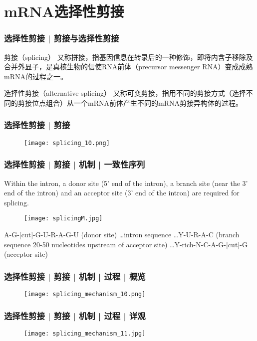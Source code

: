 \section{mRNA选择性剪接}
\begin{frame}
  \frametitle{选择性剪接 | \alert{剪接与选择性剪接}}
  \begin{block}{剪接（splicing）}
    又称拼接，指基因信息在转录后的一种修饰，即将内含子移除及合并外显子，是真核生物的信使RNA前体（precursor messenger RNA）变成成熟mRNA的过程之一。
  \end{block}
  \pause
  \begin{block}{选择性剪接（alternative splicing）}
    又称可变剪接，指用不同的剪接方式（选择不同的剪接位点组合）从一个mRNA前体产生不同的mRNA剪接异构体的过程。
  \end{block}
\end{frame}

\begin{frame}
  \frametitle{选择性剪接 | 剪接}
  \begin{figure}
    \centering
    \texttt{[image: splicing\_10.png]}
  \end{figure}
\end{frame}

\begin{frame}
  \frametitle{选择性剪接 | 剪接 | 机制 | 一致性序列}
Within the intron, a donor site (5' end of the intron), a branch site (near the 3' end of the intron) and an acceptor site (3' end of the intron) are required for splicing.
  \begin{figure}
    \centering
    \texttt{[image: splicingM.jpg]}
  \end{figure}
A-G-[cut]-G-U-R-A-G-U (donor site) \ldots intron sequence \ldots Y-U-R-A-C (branch sequence 20-50 nucleotides upstream of acceptor site) \ldots Y-rich-N-C-A-G-[cut]-G (acceptor site)
\end{frame}

\begin{frame}
  \frametitle{选择性剪接 | 剪接 | 机制 | 过程 | 概览}
  \begin{figure}
    \centering
    \texttt{[image: splicing\_mechanism\_10.png]}
  \end{figure}
\end{frame}

\begin{frame}
  \frametitle{选择性剪接 | 剪接 | 机制 | 过程 | 详观}
  \begin{figure}
    \centering
    \texttt{[image: splicing\_mechanism\_11.jpg]}
  \end{figure}
\end{frame}


